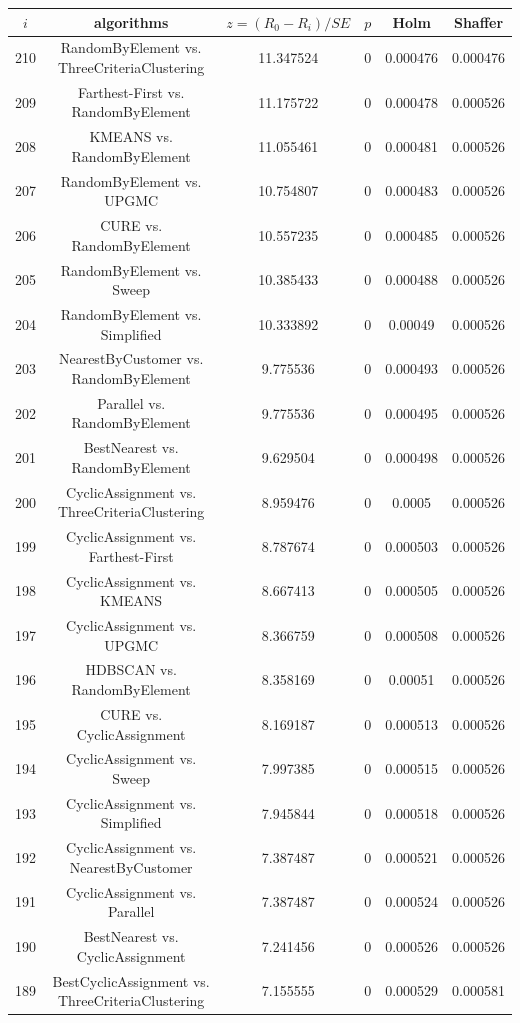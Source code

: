 \documentclass[a4paper,10pt]{article}
\begin{document}
\begin{landscape}
\begin{table}[!htp]
\centering\scriptsize
\begin{tabular}{cccccc}
$i$&algorithms&$z=(R_0 - R_i)/SE$&$p$&Holm&Shaffer\\
\hline210&RandomByElement vs. ThreeCriteriaClustering&11.347524&0&0.000476&0.000476\\
209&Farthest-First vs. RandomByElement&11.175722&0&0.000478&0.000526\\
208&KMEANS vs. RandomByElement&11.055461&0&0.000481&0.000526\\
207&RandomByElement vs. UPGMC&10.754807&0&0.000483&0.000526\\
206&CURE vs. RandomByElement&10.557235&0&0.000485&0.000526\\
205&RandomByElement vs. Sweep&10.385433&0&0.000488&0.000526\\
204&RandomByElement vs. Simplified&10.333892&0&0.00049&0.000526\\
203&NearestByCustomer vs. RandomByElement&9.775536&0&0.000493&0.000526\\
202&Parallel vs. RandomByElement&9.775536&0&0.000495&0.000526\\
201&BestNearest vs. RandomByElement&9.629504&0&0.000498&0.000526\\
200&CyclicAssignment vs. ThreeCriteriaClustering&8.959476&0&0.0005&0.000526\\
199&CyclicAssignment vs. Farthest-First&8.787674&0&0.000503&0.000526\\
198&CyclicAssignment vs. KMEANS&8.667413&0&0.000505&0.000526\\
197&CyclicAssignment vs. UPGMC&8.366759&0&0.000508&0.000526\\
196&HDBSCAN vs. RandomByElement&8.358169&0&0.00051&0.000526\\
195&CURE vs. CyclicAssignment&8.169187&0&0.000513&0.000526\\
194&CyclicAssignment vs. Sweep&7.997385&0&0.000515&0.000526\\
193&CyclicAssignment vs. Simplified&7.945844&0&0.000518&0.000526\\
192&CyclicAssignment vs. NearestByCustomer&7.387487&0&0.000521&0.000526\\
191&CyclicAssignment vs. Parallel&7.387487&0&0.000524&0.000526\\
190&BestNearest vs. CyclicAssignment&7.241456&0&0.000526&0.000526\\
189&BestCyclicAssignment vs. ThreeCriteriaClustering&7.155555&0&0.000529&0.000581\\

\end{tabular}
\end{table}
\end{landscape}
\end{document}
